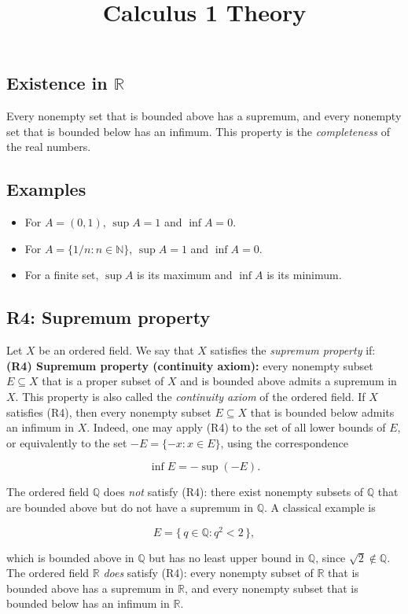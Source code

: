 \documentclass[11pt,a4paper]{article} \usepackage[T1]{fontenc}
\theoremstyle{plain} \newtheorem{theorem}{Theorem} \title{Calculus 1 Theory}
\begin{document}
\subsection*{Existence in $\mathbb{R}$}

Every nonempty set that is bounded above has a supremum, and every nonempty set
that is bounded below has an infimum. This property is the \emph{completeness}
of the real numbers.

\subsection*{Examples}

\begin{itemize}
\item For $A=(0,1)$, $\sup A=1$ and $\inf A=0$.
\item For $A=\{1/n : n\in\mathbb{N}\}$, $\sup A=1$ and $\inf A=0$.
\item For a finite set, $\sup A$ is its maximum and $\inf A$ is its minimum.
\end{itemize}

\subsection*{R4: Supremum property}

Let $X$ be an ordered field. We say that $X$ satisfies the \emph{supremum
property} if: \medskip \textbf{(R4) Supremum property (continuity axiom):}
every nonempty subset $E\subseteq X$ that is a proper subset of $X$ and is
bounded above admits a supremum in $X$. \medskip This property is also called
the \emph{continuity axiom} of the ordered field. \medskip If $X$ satisfies
(R4), then every nonempty subset $E\subseteq X$ that is bounded below admits an
infimum in $X$. Indeed, one may apply (R4) to the set of all lower bounds of
$E$, or equivalently to the set $-E=\{-x : x\in E\}$, using the correspondence

\[
\inf E = -\sup(-E).
\]

\medskip The ordered field $\mathbb{Q}$ does \emph{not} satisfy (R4): there
exist nonempty subsets of $\mathbb{Q}$ that are bounded above but do not have a
supremum in $\mathbb{Q}$. A classical example is

\[
E = \{\,q\in\mathbb{Q} : q^2 < 2\,\},
\]

which is bounded above in $\mathbb{Q}$ but has no least upper bound in
$\mathbb{Q}$, since $\sqrt{2}\notin\mathbb{Q}$. The ordered field $\mathbb{R}$
\emph{does} satisfy (R4): every nonempty subset of $\mathbb{R}$ that is bounded
above has a supremum in $\mathbb{R}$, and every nonempty subset that is bounded
below has an infimum in $\mathbb{R}$.
\end{document}
